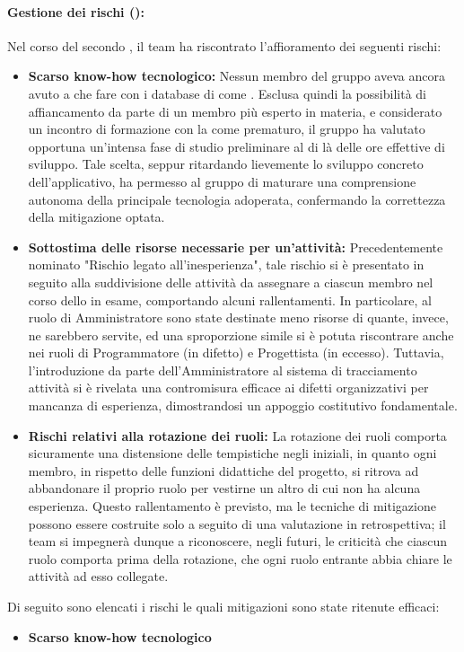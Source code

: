 \paragraph*{Gestione dei rischi ():}
\par Nel corso del secondo , il team ha riscontrato l'affioramento dei seguenti rischi:
\begin{itemize}
  \item \textbf{Scarso know-how tecnologico:}  Nessun membro del gruppo aveva ancora avuto a che fare con i database di  come . Esclusa quindi la possibilità di affiancamento da parte di un membro più esperto in materia, e considerato un incontro di formazione con la  come prematuro, il gruppo ha valutato opportuna un'intensa fase di studio preliminare al di là delle ore effettive di sviluppo. Tale scelta, seppur ritardando lievemente lo sviluppo concreto dell'applicativo, ha permesso al gruppo di maturare una comprensione autonoma della principale tecnologia adoperata, confermando la correttezza della mitigazione optata.
  \item \textbf{Sottostima delle risorse necessarie per un’attività:} Precedentemente nominato "Rischio legato all'inesperienza", tale rischio si è presentato in seguito alla suddivisione delle attività da assegnare a ciascun membro nel corso dello  in esame, comportando alcuni rallentamenti. In particolare, al ruolo di Amministratore sono state destinate meno risorse di quante, invece, ne sarebbero servite, ed una sproporzione simile si è potuta riscontrare anche nei ruoli di Programmatore (in difetto) e Progettista (in eccesso). Tuttavia, l'introduzione da parte dell'Amministratore al sistema di tracciamento attività  si è rivelata una contromisura efficace ai difetti organizzativi per mancanza di esperienza, dimostrandosi un appoggio costitutivo fondamentale.
  \item \textbf{Rischi relativi alla rotazione dei ruoli:}  La rotazione dei ruoli comporta sicuramente una distensione delle tempistiche negli  iniziali, in quanto ogni membro, in rispetto delle funzioni didattiche del progetto, si ritrova ad abbandonare il proprio ruolo per vestirne un altro di cui non ha alcuna esperienza. Questo rallentamento è previsto, ma le tecniche di mitigazione possono essere costruite solo a seguito di una valutazione in retrospettiva; il team si impegnerà dunque a riconoscere, negli  futuri, le criticità che ciascun ruolo comporta prima della rotazione, che ogni ruolo entrante abbia chiare le attività ad esso collegate.
\end{itemize}

\vspace{0.5\baselineskip}
\par Di seguito sono elencati i rischi le quali mitigazioni sono state ritenute efficaci:
\begin{itemize}
  \item \textbf{Scarso know-how tecnologico}
\end{itemize}

